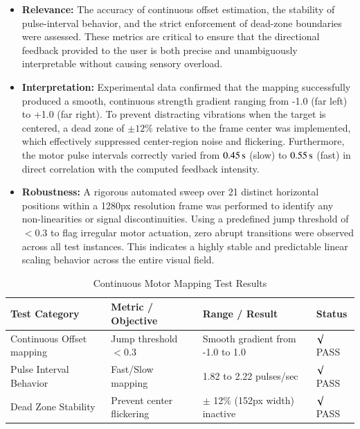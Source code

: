 \documentclass{article}
\begin{document}
\begin{itemize}
    \item \textbf{Relevance:} The accuracy of continuous offset estimation, the stability of pulse-interval behavior, and the strict enforcement of dead-zone boundaries were assessed. These metrics are critical to ensure that the directional feedback provided to the user is both precise and unambiguously interpretable without causing sensory overload.
    \item \textbf{Interpretation:} Experimental data confirmed that the mapping successfully produced a smooth, continuous strength gradient ranging from -1.0 (far left) to +1.0 (far right). To prevent distracting vibrations when the target is centered, a dead zone of $\pm 12\%$ relative to the frame center was implemented, which effectively suppressed center-region noise and flickering. Furthermore, the motor pulse intervals correctly varied from $0.45\text{\,s}$ (slow) to $0.55\text{\,s}$ (fast) in direct correlation with the computed feedback intensity.
    \item \textbf{Robustness:} A rigorous automated sweep over 21 distinct horizontal positions within a 1280px resolution frame was performed to identify any non-linearities or signal discontinuities. Using a predefined jump threshold of $< 0.3$ to flag irregular motor actuation, zero abrupt transitions were observed across all test instances. This indicates a highly stable and predictable linear scaling behavior across the entire visual field.
\end{itemize}

\begin{table}[h]
\centering
\small
\setlength{\tabcolsep}{3pt}
\renewcommand{\arraystretch}{1.2}
\begin{tabular}{p{}p{}p{}p{}}
\hline
\textbf{Test Category} & \textbf{Metric / Objective} & \textbf{Range / Result} & \textbf{Status} \\
\hline
Continuous Offset mapping & Jump threshold $< 0.3$ & Smooth gradient from -1.0 to 1.0 & $\surd$ PASS \\
Pulse Interval Behavior & Fast/Slow mapping & 1.82 to 2.22 pulses/sec & $\surd$ PASS \\
Dead Zone Stability & Prevent center flickering & $\pm$ 12\% (152px width) inactive & $\surd$ PASS \\
\hline
\end{tabular}
\caption{Continuous Motor Mapping Test Results}
\label{tab:haptic-tests}
\end{table}
\end{document}
